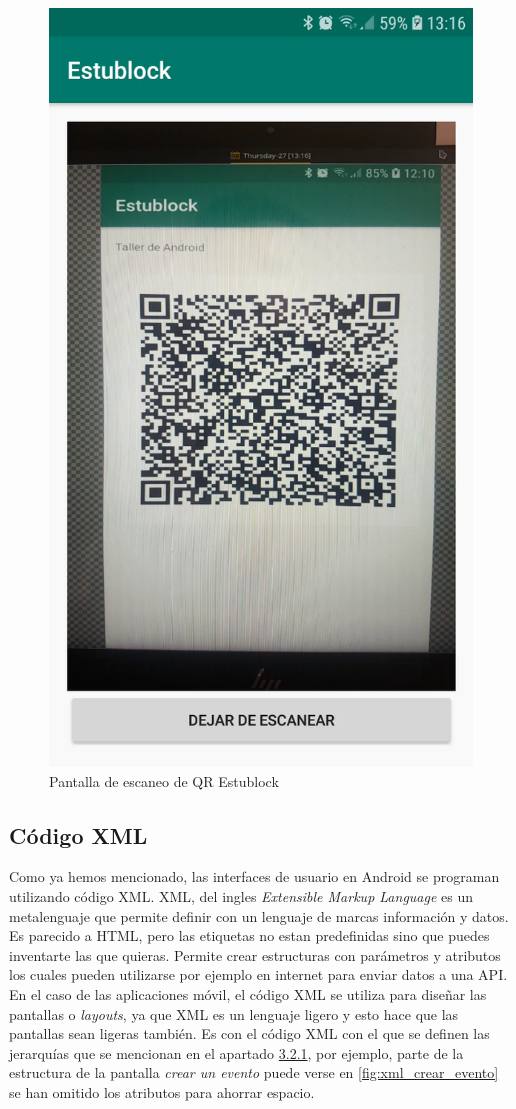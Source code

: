 \begin{figure}[h!]
  \centering
  \includegraphics[width=0.3\linewidth]{figs/Desarrollo/Interfaz/estublock_escanear_qr}
  \caption[Pantalla de Escaneo de QR]{Pantalla de escaneo de QR Estublock}
  \label{fig:pantalla_escaneo_qr}
\end{figure}

\subsection{Código XML}

Como ya hemos mencionado, las interfaces de usuario en Android se programan utilizando código XML. XML, del ingles \emph{Extensible Markup Language} es un metalenguaje que permite definir con un lenguaje de marcas información y datos. Es parecido a HTML, pero las etiquetas no estan predefinidas sino que puedes inventarte las que quieras. Permite crear estructuras con parámetros y atributos los cuales pueden utilizarse por ejemplo en internet para enviar datos a una API. En el caso de las aplicaciones móvil, el código XML se utiliza para diseñar las pantallas o \emph{layouts}, ya que XML es un lenguaje ligero y esto hace que las pantallas sean ligeras también. Es con el código XML con el que se definen las jerarquías que se mencionan en el apartado \hyperref[sec:GUI]{3.2.1}, por ejemplo, parte de la estructura de la pantalla \emph{crear un evento} puede verse en \ref{fig:xml_crear_evento} se han omitido los atributos para ahorrar espacio. 

